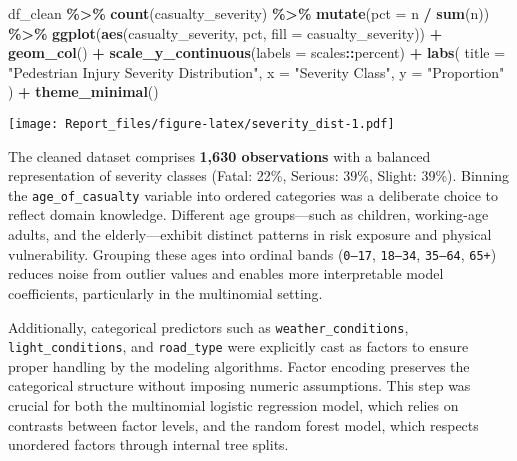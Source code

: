 \documentclass[
]{article}
\newenvironment{Shaded}{\begin{snugshade}}{\end{snugshade}}
\newcommand{\AttributeTok}[1]{\textcolor[rgb]{0.13,0.29,0.53}{#1}}
\newcommand{\FunctionTok}[1]{\textcolor[rgb]{0.13,0.29,0.53}{\textbf{#1}}}
\newcommand{\NormalTok}[1]{#1}
\newcommand{\SpecialCharTok}[1]{\textcolor[rgb]{0.81,0.36,0.00}{\textbf{#1}}}
\newcommand{\StringTok}[1]{\textcolor[rgb]{0.31,0.60,0.02}{#1}}
\begin{document}
\begin{Shaded}
\begin{Highlighting}[]
\NormalTok{df\_clean }\SpecialCharTok{\%\textgreater{}\%}
  \FunctionTok{count}\NormalTok{(casualty\_severity) }\SpecialCharTok{\%\textgreater{}\%}
  \FunctionTok{mutate}\NormalTok{(}\AttributeTok{pct =}\NormalTok{ n }\SpecialCharTok{/} \FunctionTok{sum}\NormalTok{(n)) }\SpecialCharTok{\%\textgreater{}\%}
  \FunctionTok{ggplot}\NormalTok{(}\FunctionTok{aes}\NormalTok{(casualty\_severity, pct, }\AttributeTok{fill =}\NormalTok{ casualty\_severity)) }\SpecialCharTok{+}
  \FunctionTok{geom\_col}\NormalTok{() }\SpecialCharTok{+}
  \FunctionTok{scale\_y\_continuous}\NormalTok{(}\AttributeTok{labels =}\NormalTok{ scales}\SpecialCharTok{::}\NormalTok{percent) }\SpecialCharTok{+}
  \FunctionTok{labs}\NormalTok{(}
    \AttributeTok{title =} \StringTok{"Pedestrian Injury Severity Distribution"}\NormalTok{,}
    \AttributeTok{x =} \StringTok{"Severity Class"}\NormalTok{,}
    \AttributeTok{y =} \StringTok{"Proportion"}
\NormalTok{  ) }\SpecialCharTok{+}
  \FunctionTok{theme\_minimal}\NormalTok{()}
\end{Highlighting}
\end{Shaded}

\texttt{[image: Report\_files/figure-latex/severity\_dist-1.pdf]}

The cleaned dataset comprises \textbf{1,630 observations} with a
balanced representation of severity classes (Fatal: 22\%, Serious: 39\%,
Slight: 39\%). Binning the \texttt{age\_of\_casualty} variable into
ordered categories was a deliberate choice to reflect domain knowledge.
Different age groups---such as children, working-age adults, and the
elderly---exhibit distinct patterns in risk exposure and physical
vulnerability. Grouping these ages into ordinal bands (\texttt{0–17},
\texttt{18–34}, \texttt{35–64}, \texttt{65+}) reduces noise from outlier
values and enables more interpretable model coefficients, particularly
in the multinomial setting.

Additionally, categorical predictors such as
\texttt{weather\_conditions}, \texttt{light\_conditions}, and
\texttt{road\_type} were explicitly cast as factors to ensure proper
handling by the modeling algorithms. Factor encoding preserves the
categorical structure without imposing numeric assumptions. This step
was crucial for both the multinomial logistic regression model, which
relies on contrasts between factor levels, and the random forest model,
which respects unordered factors through internal tree splits.
\end{document}
